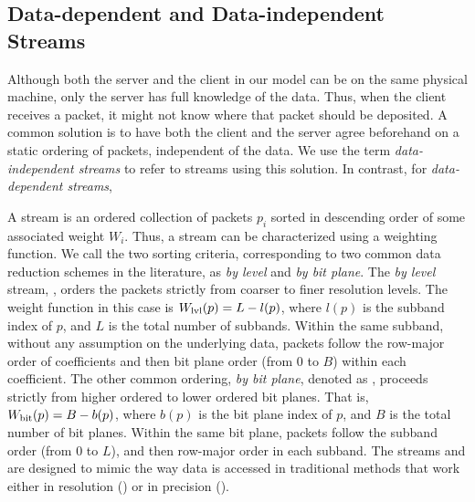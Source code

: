 \subsection{Data-dependent and Data-independent Streams} \label{sec:static-dynamic-streams}

Although both the server and the client in our model can be on the same physical
machine, only the server has full knowledge of the data. Thus, when the client
receives a packet, it might not know where that packet should be deposited. A
common solution is to have both the client and the server agree beforehand on a
static ordering of packets, independent of the data. We use the term
\emph{data-independent streams} to refer to streams using this solution. In
contrast, for \emph{data-dependent streams},  

A stream is an ordered collection of packets $p_i$ sorted in descending order
of some associated weight $W_i$. Thus, a stream can be characterized using a
weighting function.
%
We call the two sorting criteria, corresponding to two common data reduction
schemes in the literature, as \emph{by level} and \emph{by bit plane}.  The
\emph{by level} stream, \slvl, orders the packets strictly from coarser to
finer resolution levels. The weight function in this case is $\wlvl(p)=L-l(p)$,
where $l(p)$ is the subband index of $p$, and $L$ is the total number of
subbands. Within the same subband, without any assumption on the underlying
data, packets follow the row-major order of coefficients and then bit plane order
(from 0 to $B$) within each coefficient. The other common ordering, \emph{by
bit plane}, denoted as \sbit, proceeds strictly from higher ordered to
lower ordered bit planes. That is, $\wbit(p)=B-b(p)$, where $b(p)$ is the bit
plane index of $p$, and $B$ is the total number of bit planes. Within the same
bit plane, packets follow the subband order (from 0 to $L$), and then row-major
order in each subband. 
%
The streams \slvl and \sbit are designed to mimic the way data is accessed in
traditional methods that work either in resolution (\slvl) or in precision
(\sbit). 

